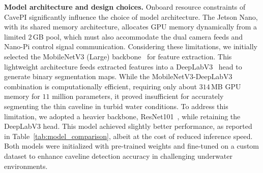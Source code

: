 \vspace{1mm}
\noindent
\textbf{Model architecture and design choices.} Onboard resource constraints of CavePI significantly influence the choice of model architecture. The Jetson Nano, with its shared memory architecture, allocates GPU memory dynamically from a limited $2$\,GB pool, which must also accommodate the dual camera feeds and Nano-Pi control signal communication. Considering these limitations, we initially selected the MobileNetV3 (Large) backbone~\cite{howard2019searching} for feature extraction. This lightweight architecture feeds extracted features into a DeepLabV3~\cite{chen2017rethinking} head to generate binary segmentation maps. While the MobileNetV3-DeepLabV3 combination is computationally efficient, requiring only about $314$\,MB GPU memory for $11$ million parameters, it proved insufficient for accurately segmenting the thin caveline in turbid water conditions. To address this limitation, we adopted a heavier backbone, ResNet101~\cite{he2016deep}, while retaining the DeepLabV3 head. This model achieved slightly better performance, as reported in Table~\ref{tab:model_comparison}, albeit at the cost of reduced inference speed. Both models were initialized with pre-trained weights and fine-tuned on a custom dataset to enhance caveline detection accuracy in challenging underwater environments.






